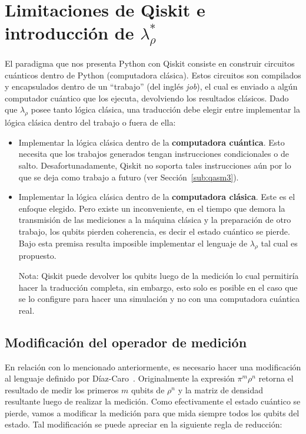 \section{\texorpdfstring{Limitaciones de Qiskit e introducción de $\lambda_\rho^*$}{Limitaciones de Qiskit e introducción de Lambda Rho*}}\label{sub:qiskit_lim}
El paradigma que nos presenta Python con Qiskit consiste en construir circuitos cuánticos dentro de Python (computadora clásica). Estos circuitos son compilados y encapsulados dentro de un ``trabajo'' (del inglés \textit{job}), el cual es enviado a algún computador cuántico que los ejecuta, devolviendo los resultados clásicos. Dado que $\lambda_\rho$ posee tanto lógica clásica, una traducción debe elegir entre implementar la lógica clásica dentro del trabajo o fuera de ella:
\begin{itemize}
    \item Implementar la lógica clásica dentro de la \textbf{computadora cuántica}. Esto necesita que los trabajos generados tengan instrucciones condicionales o de salto. Desafortunadamente, Qiskit no soporta tales instrucciones aún por lo que se deja como trabajo a futuro (ver Sección~\ref{sub:qasm3}).
    \item Implementar la lógica clásica dentro de la \textbf{computadora clásica}. Este es el enfoque elegido. Pero existe un inconveniente, en el tiempo que demora la transmisión de las mediciones a la máquina clásica y la preparación de otro trabajo, los qubits pierden coherencia, es decir el estado cuántico se pierde. Bajo esta premisa resulta imposible implementar el lenguaje de $\lambda_\rho$ tal cual es propuesto.
    
    \begin{it}
        Nota: Qiskit puede devolver los qubits luego de la medición lo cual permitiría hacer la traducción completa, sin embargo, esto solo es posible en el caso que se lo configure para hacer una simulación y no con una computadora cuántica real. %
    \end{it}
\end{itemize}


\subsection{Modificación del operador de medición}\label{sub:lambda_rho_mod}
En relación con lo mencionado anteriormente, es necesario hacer una modificación al lenguaje definido por Díaz-Caro~\cite{lamrho}. Originalmente la expresión $\pi^m \rho^n$ retorna el resultado de medir los primeros $m$ qubits de $\rho^n$ y la matriz de densidad resultante luego de realizar la medición. Como efectivamente el estado cuántico se pierde, vamos a modificar la medición para que mida siempre todos los qubits del estado. Tal modificación se puede apreciar en la siguiente regla de reducción:

